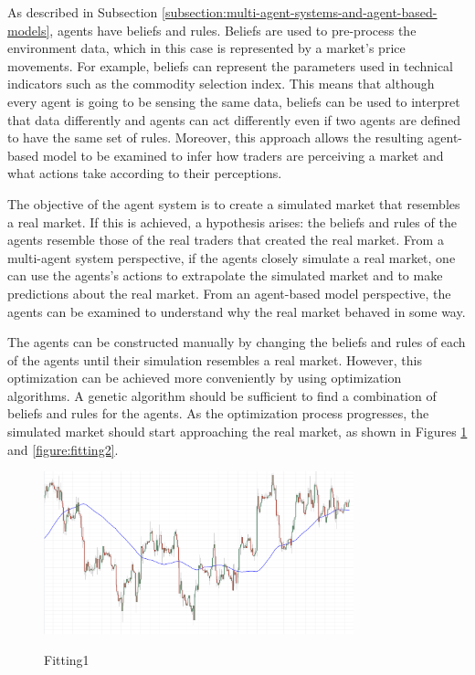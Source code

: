 \documentclass[review]{elsarticle}
\begin{document}
As described in Subsection
\ref{subsection:multi-agent-systems-and-agent-based-models}, agents have beliefs
and rules. Beliefs are used to pre-process the environment data, which in this
case is represented by a market's price movements. For example, beliefs can
represent the parameters used in technical indicators such as the commodity
selection index. This means that although every agent is going to be sensing the
same data, beliefs can be used to interpret that data differently and agents can
act differently even if two agents are defined to have the same set of
rules. Moreover, this approach allows the resulting agent-based model to be
examined to infer how traders are perceiving a market and what actions take
according to their perceptions.

The objective of the agent system is to create a simulated market that resembles
a real market. If this is achieved, a hypothesis arises: the beliefs and rules
of the agents resemble those of the real traders that created the real
market. From a multi-agent system perspective, if the agents closely simulate a
real market, one can use the agents's actions to extrapolate the simulated
market and to make predictions about the real market. From an agent-based model
perspective, the agents can be examined to understand why the real market
behaved in some way.

The agents can be constructed manually by changing the beliefs and rules of each
of the agents until their simulation resembles a real market. However, this
optimization can be achieved more conveniently by using optimization
algorithms. A genetic algorithm should be sufficient to find a combination of
beliefs and rules for the agents. As the optimization process progresses, the
simulated market should start approaching the real market, as shown in Figures
\ref{figure:fitting1} and \ref{figure:fitting2}.

\begin{figure}
\caption{Fitting1}
\centering
\includegraphics[width=0.8\textwidth]{img/fitting1.png}
\label{figure:fitting1}
\end{figure}
\end{document}
